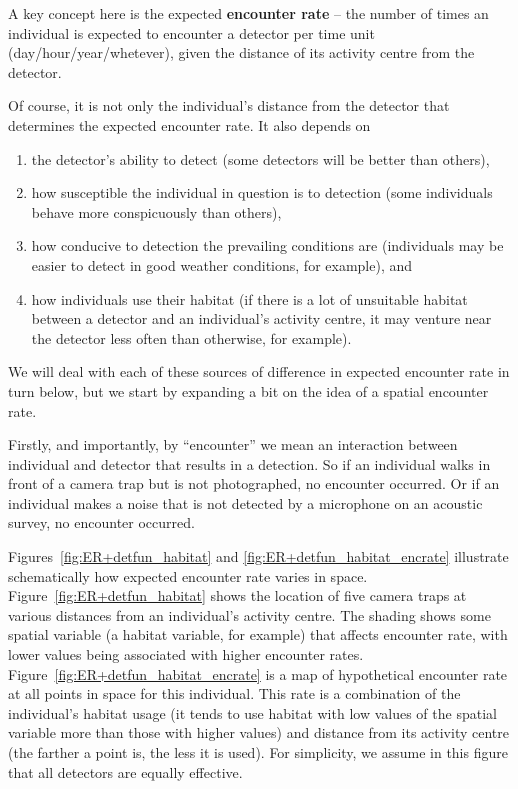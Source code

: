 \documentclass[graybox,envcountchap,sectrefs]{SpringerStyleFiles/styles/svmono}\usepackage[]{graphicx}\usepackage[]{color}
\begin{document}
A key concept here is the expected \textbf{encounter rate} -- the number of times an individual is expected to encounter a detector per time unit (day/hour/year/whetever), given the distance of its activity centre from the detector. %

Of course, it is not only the individual's distance from the detector that determines the expected encounter rate. It also depends on 
\begin{enumerate}
\item the detector's ability to detect (some detectors will be better than others), 
\item how susceptible the individual in question is to detection (some individuals behave more conspicuously than others), 
\item how conducive to detection the prevailing conditions are (individuals may be easier to detect in good weather conditions, for example), and 
\item how individuals use their habitat (if there is a lot of unsuitable habitat between a detector and an individual's activity centre, it may venture near the detector less often than otherwise, for example).  
\end{enumerate}

We will deal with each of these sources of difference in expected encounter rate in turn below, but we start by expanding a bit on the idea of a spatial encounter rate.

Firstly, and importantly, by ``encounter'' we mean an interaction between individual and detector that results in a detection. So if an individual walks in front of a camera trap but is not photographed, no encounter occurred. Or if an individual makes a noise that is not detected by a microphone on an acoustic survey, no encounter occurred. 

Figures~\ref{fig:ER+detfun_habitat} and \ref{fig:ER+detfun_habitat_encrate} illustrate schematically how expected encounter rate varies in space. Figure~\ref{fig:ER+detfun_habitat} shows the location of five camera traps at various distances from an individual's activity centre. The shading shows some spatial variable (a habitat variable, for example) that affects encounter rate, with lower values being associated with higher encounter rates. Figure~\ref{fig:ER+detfun_habitat_encrate} is a map of hypothetical encounter rate at all points in space for this individual. This rate is a combination of the individual's habitat usage (it tends to use habitat with low values of the spatial variable more than those with higher values) and distance from its activity centre (the farther a point is, the less it is used). For simplicity, we assume in this figure that all detectors are equally effective.
\end{document}
